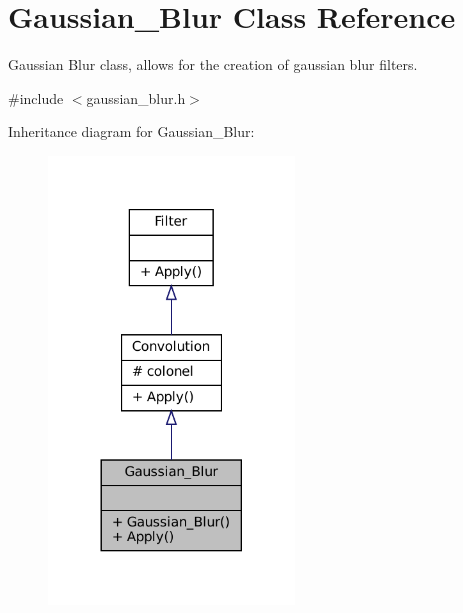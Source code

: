 \hypertarget{classGaussian__Blur}{}\section{Gaussian\+\_\+\+Blur Class Reference}
\label{classGaussian__Blur}


Gaussian Blur class, allows for the creation of gaussian blur filters.  




{\ttfamily \#include $<$gaussian\+\_\+blur.\+h$>$}



Inheritance diagram for Gaussian\+\_\+\+Blur\+:
\nopagebreak
\begin{figure}[H]
\begin{center}
\leavevmode
\includegraphics[width=185pt]{classGaussian__Blur__inherit__graph}
\end{center}
\end{figure}


